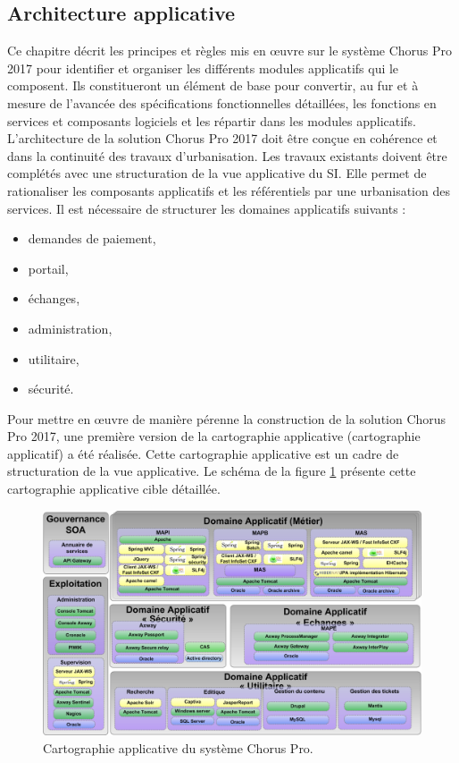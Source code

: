 \documentclass[12pt,a4paper]{article}
\begin{document}
\subsection{Architecture applicative}
Ce chapitre décrit les principes et règles mis en œuvre sur le système Chorus Pro 2017 pour identifier et organiser les différents modules applicatifs qui le composent. Ils constitueront un élément de base pour convertir, au fur et à mesure de l’avancée des spécifications fonctionnelles détaillées, les fonctions en services et composants logiciels et les répartir dans les modules applicatifs.\\
L’architecture de la solution Chorus Pro 2017 doit être conçue en cohérence et dans la continuité des travaux d’urbanisation. Les travaux existants doivent être complétés avec une structuration de la vue applicative du SI. Elle permet de rationaliser les composants applicatifs et les référentiels par une urbanisation des services. Il est nécessaire de structurer les domaines applicatifs suivants :
\begin{itemize}
\item	demandes de paiement,
\item	portail,
\item	échanges,
\item	administration,
\item	utilitaire,
\item	sécurité.
\end{itemize}
Pour mettre en œuvre de manière pérenne la construction de la solution Chorus Pro 2017, une première version de la cartographie applicative (cartographie applicatif) a été réalisée. Cette cartographie applicative est un cadre de structuration de la vue applicative. Le schéma de la figure \ref{vueApplicative} présente cette cartographie applicative cible détaillée.\\
\begin{figure}[H]
	\begin{center}
		\includegraphics[width=\textwidth, height=\textheight, keepaspectratio]{cartographieApplicative.png}
		\caption{Cartographie applicative du système Chorus Pro.}
		\label{vueApplicative}
	\end{center}
\end{figure}
\end{document}
